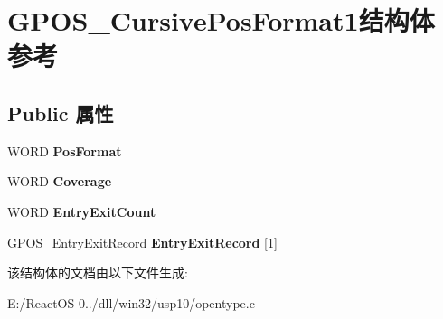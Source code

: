 \hypertarget{struct_g_p_o_s___cursive_pos_format1}{}\section{G\+P\+O\+S\+\_\+\+Cursive\+Pos\+Format1结构体 参考}
\label{struct_g_p_o_s___cursive_pos_format1}
\subsection*{Public 属性}
\begin{DoxyCompactItemize}
\item 
\mbox{\label{struct_g_p_o_s___cursive_pos_format1_ac664fd5cdf96fda70066405cceba8b30}} 
W\+O\+RD {\bfseries Pos\+Format}
\item 
\mbox{\label{struct_g_p_o_s___cursive_pos_format1_a7585bf754f08a73fef585c5088c4c04d}} 
W\+O\+RD {\bfseries Coverage}
\item 
\mbox{\label{struct_g_p_o_s___cursive_pos_format1_ae76f141410ba02d0797bd67329925456}} 
W\+O\+RD {\bfseries Entry\+Exit\+Count}
\item 
\mbox{\label{struct_g_p_o_s___cursive_pos_format1_ac98a2b44fec6369bc56f1e60aa9c6997}} 
\hyperlink{struct_g_p_o_s___entry_exit_record}{G\+P\+O\+S\+\_\+\+Entry\+Exit\+Record} {\bfseries Entry\+Exit\+Record} \mbox{[}1\mbox{]}
\end{DoxyCompactItemize}


该结构体的文档由以下文件生成\+:\begin{DoxyCompactItemize}
\item 
E\+:/\+React\+O\+S-\/0../dll/win32/usp10/opentype.\+c\end{DoxyCompactItemize}
